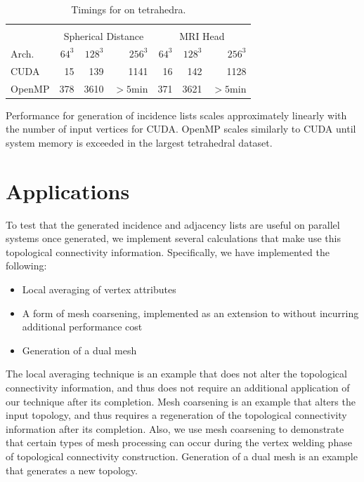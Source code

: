 \documentclass[10pt,journal,cspaper,compsoc]{IEEEtran}
\begin{document}
\begin{table}[tb!]
\begin{center}
\caption{Timings for  on tetrahedra.}
\label{tab:toptimingstetra}
\begin{tabular}{l|r r r|r r r}
\multicolumn{7}{c}{ } \\
 & \multicolumn{3}{|c|}{Spherical Distance} & \multicolumn{3}{|c}{MRI Head}\\
Arch. & $64^3$ & $128^3$ & $256^3$ & $64^3$ & $128^3$ & $256^3$\\
\hline
CUDA & 15 & 139 & 1141 & 16 & 142 & 1128 \\
OpenMP & 378 & 3610 & $>5$min & 371 & 3621 & $>5$min \\
\end{tabular}
\end{center}
\end{table}

Performance for generation of incidence lists scales approximately linearly with the number of input vertices for CUDA. OpenMP scales similarly to CUDA until system memory is exceeded in the largest tetrahedral dataset.

\section{Applications}
To test that the generated incidence and adjacency lists are useful on parallel systems once generated, we implement several calculations that make use this topological connectivity information. Specifically, we have implemented the following:

\begin{itemize}
\item{Local averaging of vertex attributes}
\item{A form of mesh coarsening, implemented as an extension to  without incurring additional performance cost}
\item{Generation of a dual mesh}
\end{itemize}

The local averaging technique is an example that does not alter the topological connectivity information, and thus does not require an additional application of our technique after its completion. Mesh coarsening is an example that alters the input topology, and thus requires a regeneration of the topological connectivity information after its completion. Also, we use mesh coarsening to demonstrate that certain types of mesh processing can occur during the vertex welding phase of topological connectivity construction. Generation of a dual mesh is an example that generates a new topology.
\end{document}

